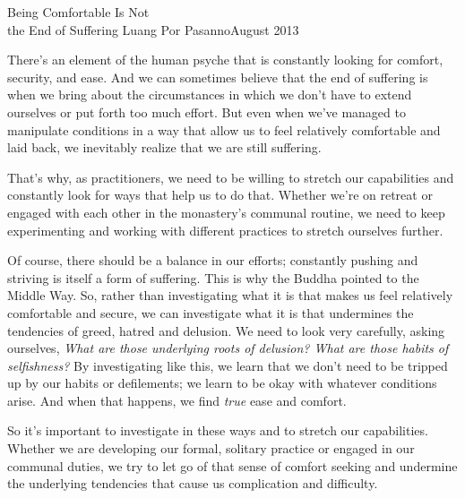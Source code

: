 {Being Comfortable Is Not\\the End of Suffering}
{Luang Por Pasanno}{August 2013}

There's an element of the human psyche that is constantly looking for 
comfort, security, and ease. And we can sometimes believe that the end 
of suffering is when we bring about the circumstances in which we don't 
have to extend ourselves or put forth too much effort. But even when 
we've managed to manipulate conditions in a way that allow us to feel 
relatively comfortable and laid back, we inevitably realize that we are 
still suffering.

That's why, as practitioners, we need to be willing to stretch our 
capabilities and constantly look for ways that help us to do that. 
Whether we're on retreat or engaged with each other in the monastery's 
communal routine, we need to keep experimenting and working with 
different practices to stretch ourselves further.

Of course, there should be a balance in our efforts; constantly pushing 
and striving is itself a form of suffering. This is why the Buddha 
pointed to the Middle Way. So, rather than investigating what it is 
that makes us feel relatively comfortable and secure, we can 
investigate what it is that undermines the tendencies of greed, hatred 
and delusion. We need to look very carefully, asking ourselves, 
\emph{What are those underlying roots of delusion? What are those 
habits of selfishness?} By investigating like this, we learn that we 
don't need to be tripped up by our habits or defilements; we learn to 
be okay with whatever conditions arise. And when that happens, we find 
\emph{true} ease and comfort.

So it's important to investigate in these ways and to stretch our 
capabilities. Whether we are developing our formal, solitary practice 
or engaged in our communal duties, we try to let go of that sense of 
comfort seeking and undermine the underlying tendencies that cause us 
complication and difficulty.

